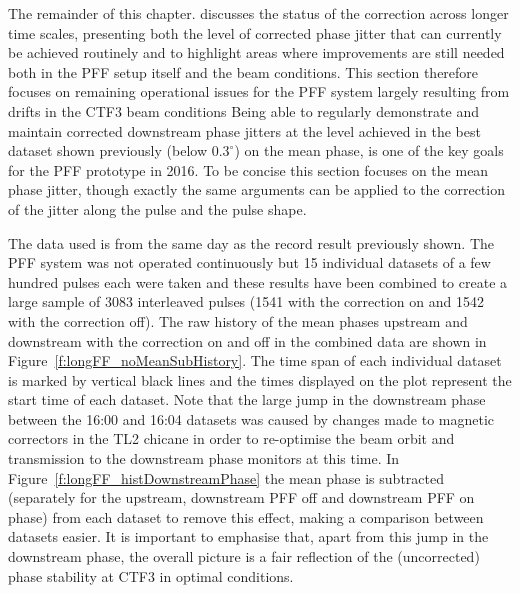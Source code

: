 
The remainder of this chapter.  
discusses the status of the correction across longer time scales, presenting both the 
level of corrected phase jitter that can currently be achieved routinely and to 
highlight areas where improvements are still needed both in the PFF setup itself and the beam conditions. 
This section therefore focuses on remaining operational issues for the PFF system 
largely resulting from drifts in the CTF3 beam conditions
Being able to regularly demonstrate and maintain corrected downstream 
phase jitters at the level achieved in the best dataset shown previously (below 
\(0.3^\circ\)) on the mean phase, is one of the key goals for the PFF prototype in 2016. 
To be concise this section focuses on the mean phase jitter, though exactly the same 
arguments can be applied to the correction of the jitter along the pulse and the pulse 
shape.

The data used is from  the same day as 
the record result previously shown. The PFF 
system was not operated continuously but 15 
individual datasets of a few hundred pulses each were taken and these results have been 
combined to create a large sample of 3083 interleaved pulses (1541 with the correction 
on and 1542 with the correction off). The raw history of the mean phases upstream and 
downstream with the correction on and off in the combined data are shown in 
Figure~\ref{f:longFF_noMeanSubHistory}. The time span of each individual dataset is marked by 
vertical black lines and the times displayed on the plot represent the start time of 
each dataset. Note that the large jump in the downstream phase between the 16:00 and 
16:04 datasets was caused by changes made to magnetic correctors in the TL2 chicane in 
order to re-optimise the beam orbit and transmission to the downstream phase monitors at this time. 
In Figure~\ref{f:longFF_histDownstreamPhase} the mean phase is subtracted 
(separately for the upstream, downstream PFF off and downstream PFF on phase) from each 
dataset to remove this effect, making a comparison between datasets easier. It is 
important to emphasise that, apart from this jump in the downstream phase, the overall 
picture is a fair reflection of the (uncorrected) phase stability at CTF3 in optimal 
conditions. 


